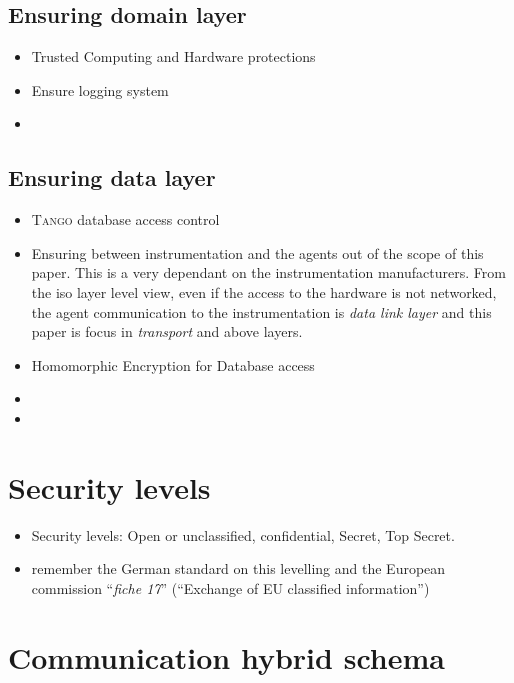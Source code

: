 \documentclass[10pt,a4paper,twoside]{llncs}
\newcommand{\tango}{\textsc{Tango} }
\begin{document}
%
\subsection{Ensuring domain layer \label{sec:domainLayer}}

\begin{itemize}
 \item Trusted Computing and Hardware protections
 \item Ensure logging system
 \item 
\end{itemize}

%
\subsection{Ensuring data layer \label{sec:dataLayer}}

\begin{itemize}
 \item \tango database access control
 \item Ensuring between instrumentation and the agents out of the scope of this paper. This is a very dependant on the instrumentation manufacturers. From the iso layer level view, even if the access to the hardware is not networked, the agent communication to the instrumentation is \emph{data link layer} and this paper is focus in \emph{transport} and above layers.
 \item Homomorphic Encryption for Database access
 \item  
 \item 
\end{itemize}

%
\section{Security levels \label{sec:secLevel}}

\begin{itemize}
 \item Security levels: Open or unclassified, confidential, Secret, Top Secret.
 \item remember the German standard on this levelling and the European commission ``\emph{fiche 17}'' (``Exchange of EU classified information'')
\end{itemize}

%
\section{Communication hybrid schema \label{sec:intercom}}
\end{document}
